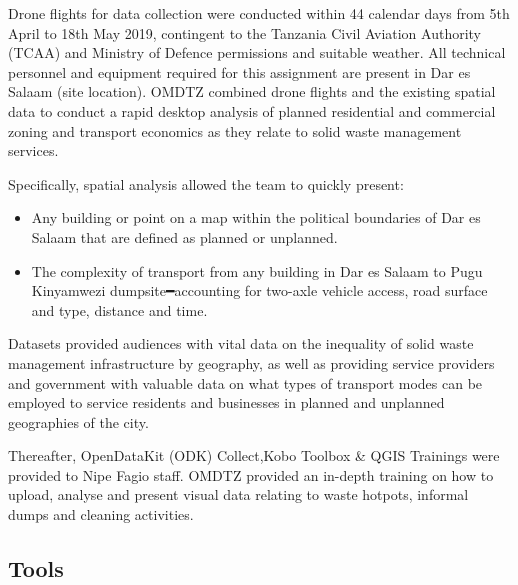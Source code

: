 \documentclass[a4paper,12pt,twoside]{article}
\begin{document}
Drone flights for data collection were conducted within 44 calendar days from 5th April to 18th May 2019, contingent  to the Tanzania Civil Aviation Authority (TCAA) and Ministry of Defence permissions and suitable weather. All technical personnel and equipment required for this assignment are present in Dar es Salaam (site location).   
OMDTZ  combined drone flights and the existing spatial data to conduct a rapid desktop analysis of planned residential and commercial zoning and transport economics as they relate to solid waste management services. 

Specifically, spatial analysis allowed the team to quickly present:
\begin{itemize}
\item Any building or point on a map within the political boundaries of Dar es Salaam that are defined as planned or unplanned.   
\item The complexity of transport from any building in Dar es Salaam to Pugu Kinyamwezi dumpsite━accounting for two-axle vehicle access, road surface and type, distance and time. 
\end{itemize} 

Datasets provided audiences with vital data on the inequality of solid waste management infrastructure by geography, as well as providing service providers and government with valuable data on what types of transport modes can be employed to service residents and businesses in planned and unplanned geographies of the city.

Thereafter, OpenDataKit (ODK) Collect,Kobo Toolbox & QGIS Trainings were provided to Nipe Fagio staff. OMDTZ provided an in-depth training on how to upload, analyse and present visual data relating to waste hotpots, informal dumps and cleaning activities.

\subsection{Tools}
\end{document}
